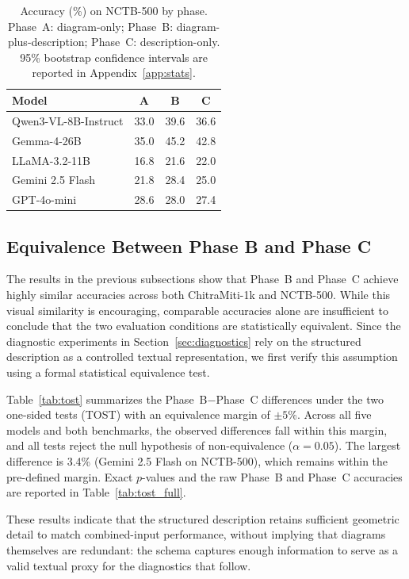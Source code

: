 \documentclass[11pt]{article}
\begin{document}
\begin{table}[t]
\centering
\small
\begin{tabular}{lccc}
\toprule
Model & A & B & C \\
\midrule
Qwen3-VL-8B-Instruct      & 33.0 & 39.6 & 36.6 \\
Gemma-4-26B      & 35.0 & 45.2 & 42.8 \\
LLaMA-3.2-11B    & 16.8 & 21.6 & 22.0 \\
Gemini 2.5 Flash & 21.8 & 28.4 & 25.0 \\
GPT-4o-mini      & 28.6 & 28.0 & 27.4 \\
\bottomrule
\end{tabular}
\caption{Accuracy (\%) on NCTB-500 by phase. Phase~A: diagram-only; Phase~B: diagram-plus-description; Phase~C: description-only. 95\% bootstrap confidence intervals are reported in Appendix~\ref{app:stats}.}
\label{tab:nctb_results}
\end{table}

\subsection{Equivalence Between Phase B and Phase C}
\label{ssec:tost}

The results in the previous subsections show that Phase~B and Phase~C achieve highly similar accuracies across both ChitraMiti-1k and NCTB-500. While this visual similarity is encouraging, comparable accuracies alone are insufficient to conclude that the two evaluation conditions are statistically equivalent. Since the diagnostic experiments in Section~\ref{sec:diagnostics} rely on the structured description as a controlled textual representation, we first verify this assumption using a formal statistical equivalence test.

Table~\ref{tab:tost} summarizes the Phase~B$-$Phase~C differences under the two one-sided tests (TOST) with an equivalence margin of $\pm 5$\%. Across all five models and both benchmarks, the observed differences fall within this margin, and all tests reject the null hypothesis of non-equivalence ($\alpha = 0.05$). The largest difference is 3.4\% (Gemini 2.5 Flash on NCTB-500), which remains within the pre-defined margin. Exact $p$-values and the raw Phase~B and Phase~C accuracies are reported in Table~\ref{tab:tost_full}.

These results indicate that the structured description retains sufficient geometric detail to match combined-input performance, without implying that diagrams themselves are redundant: the schema captures enough information to serve as a valid textual proxy for the diagnostics that follow.
\end{document}
